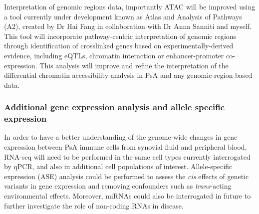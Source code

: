 Interpretation of genomic regions data, importantly ATAC will be improved using a tool currently under development known as Atlas and Analysis of Pathways (A2), created by Dr Hai Fang in collaboration with Dr Anna Sanniti and myself. This tool will incorporate pathway-centric interpretation of genomic regions through identification of crosslinked genes based on experimentally-derived evidence, including eQTLs, chromatin interaction or enhancer-promoter co-expression. This analysis will improve and refine the interpretation of the differential chromatin accessibility analysis in PsA and any genomic-region based data.



\subsubsection{Additional gene expression analysis and allele specific expression}
In order to have a better understanding of the genome-wide changes in gene expression between PsA immune cells from synovial fluid and peripheral blood, RNA-seq will need to be performed in the same cell types currently interrogated by qPCR, and also in additional cell populations of interest. Allele-specific expression (ASE) analysis could be performed to assess the \textit{cis} effects of genetic variants in gene expression and removing confounders such as \textit{trans}-acting environmental effects. Moreover, miRNAs could also be interrogated in future to further investigate the role of non-coding RNAs in disease.%

